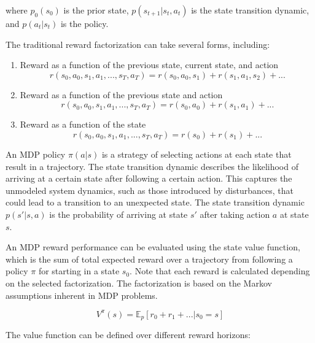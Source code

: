 \documentclass[11pt]{article}
\begin{document}
where $p_0(s_0)$ is the prior state, $p(s_{t+1}|s_t, a_t)$ is the state transition dynamic, and $p(a_t|s_t)$ is the policy.

The traditional reward factorization can take several forms, including:
\begin{enumerate}
\item Reward as a function of the previous state, current state, and action
\begin{equation}
    r(s_0, a_0, s_1, a_1, ... , s_T, a_T) = r(s_0, a_0, s_1) + r(s_1, a_1, s_2) + ...
\end{equation}

\item Reward as a function of the previous state and action
\begin{equation}
    r(s_0, a_0, s_1, a_1, ... , s_T, a_T) = r(s_0, a_0) + r(s_1, a_1) + ... 
\end{equation}

\item Reward as a function of the state
\begin{equation}
    r(s_0, a_0, s_1, a_1, ... , s_T, a_T) = r(s_0) + r(s_1) + ... 
\end{equation}
\end{enumerate}

An MDP policy $\pi(a|s)$ is a strategy of selecting actions at each state that result in a trajectory. The state transition dynamic describes the likelihood of arriving at a certain state after following a certain action. This captures the unmodeled system dynamics, such as those introduced by disturbances, that could lead to a transition to an unexpected state. The state transition dynamic $p(s'|s,a)$ is the probability of arriving at state $s'$ after taking action $a$ at state $s$.

An MDP reward performance can be evaluated using the state value function, which is the sum of total expected reward over a trajectory from following a policy $\pi$ for starting in a state $s_0$. Note that each reward is calculated depending on the selected factorization. The factorization is based on the Markov assumptions inherent in MDP problems.

\begin{equation}
    V^{\pi}(s) = \mathbb{E}_p [r_0 + r_1 + ... | s_0 = s]
\end{equation}

The value function can be defined over different reward horizons:
\end{document}
